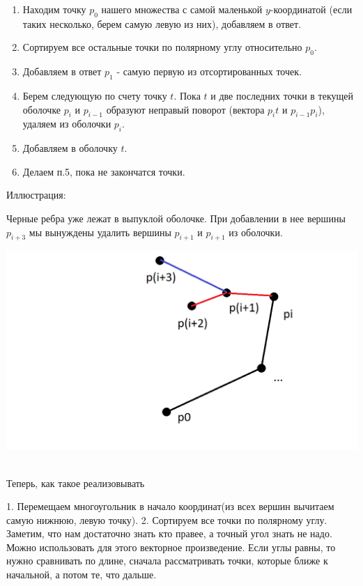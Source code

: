 \begin{enumerate}
    \item Находим точку $p_0$ нашего множества с самой маленькой $y$-координатой (если таких несколько, берем самую левую из них), добавляем в ответ.
    \item Сортируем все остальные точки по полярному углу относительно $p_0$.
    \item Добавляем в ответ $p_1$ - самую первую из отсортированных точек.
    \item Берем следующую по счету точку $t$. Пока $t$ и две последних точки в текущей оболочке $p_i$ и $p_{i-1}$ образуют неправый поворот (вектора $p_it$ и $p_{i-1}p_i$), удаляем из оболочки $p_i$.
    \item Добавляем в оболочку $t$.
    \item Делаем п.5, пока не закончатся точки.
\end{enumerate}

Иллюстрация:

Черные ребра уже лежат в выпуклой оболочке. При добавлении в нее вершины $p_{i + 3}$ мы вынуждены удалить вершины $p_{i + 1}$ и $p_{i + 1}$ из оболочки.\\

\begin{minipage}[r]{0.3\linewidth} 
    \includegraphics[width=2\linewidth]{images/47_1.png}
\end{minipage} \\

Теперь, как такое реализовывать

1. Перемещаем многоугольник в начало координат(из всех вершин вычитаем самую нижнюю,
левую точку).
2. Сортируем все точки по полярному углу.
Заметим, что нам достаточно знать кто правее, а точный угол знать не надо. Можно использовать для этого векторное произведение.
Если углы равны, то нужно сравнивать по длине, сначала рассматривать точки, которые ближе к начальной, а потом те, что дальше.

